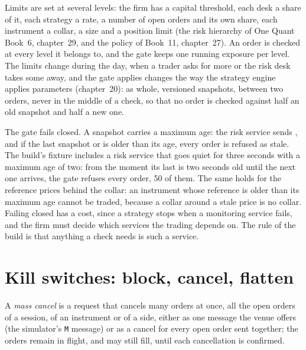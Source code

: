Limits are set at several levels: the firm has a capital threshold, each desk a share of it, each strategy a rate, a number of
open orders and its own share, each instrument a collar, a size and a position limit (the risk hierarchy of One Quant Book~6,
chapter~29, and the policy of Book~11, chapter~27). An order is checked at every level it belongs to, and the gate keeps one
running exposure per level. The limits change during the day, when a trader asks for more or the risk desk takes some away,
and the gate applies changes the way the strategy engine applies parameters (chapter~20): as whole, versioned snapshots,
between two orders, never in the middle of a check, so that no order is checked against half an old snapshot and half a new
one.

The gate fails closed. A snapshot carries a maximum age: the risk service sends , and if the last snapshot or
 is older than its age, every order is refused as stale. The build's fixture includes a risk service that goes
quiet for three seconds with a maximum age of two: from the moment its last  is two seconds old until the next one
arrives, the gate refuses every order, 50 of them. The same holds for the reference prices behind the collar: an instrument whose reference is older than its maximum age
cannot be traded, because a collar around a stale price is no collar. Failing closed has a cost, since a strategy stops when a
monitoring service fails, and the firm must decide which services the trading depends on. The rule of the build is that
anything a check needs is such a service.

\section{Kill switches: block, cancel, flatten}

\begin{definition}\label{def:ll:pre-trade-risk-and-kill-switches:mass}
A \emph{mass cancel} is a request that cancels many orders at once, all the open orders of a session, of an
instrument or of a side, either as one message the venue offers (the simulator's \texttt{M} message) or as a cancel for every
open order sent together; the orders remain in flight, and may still fill, until each cancellation is confirmed.
\end{definition}

